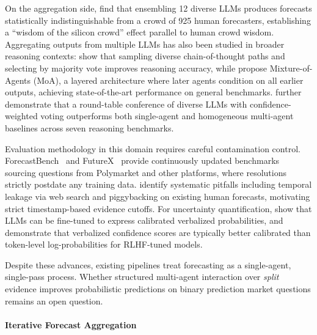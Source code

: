 \documentclass[11pt]{article}
\theoremstyle{definition}          %
\begin{document}
On the aggregation side, \citet{schoenegger2024wisdom} find that ensembling 12 diverse LLMs produces forecasts statistically indistinguishable from a crowd of 925 human forecasters, establishing a ``wisdom of the silicon crowd'' effect parallel to human crowd wisdom.
Aggregating outputs from multiple LLMs has also been studied in broader reasoning contexts: \citet{wangself} show that sampling diverse chain-of-thought paths and selecting by majority vote improves reasoning accuracy, while \citet{wangmixture} propose Mixture-of-Agents (MoA), a layered architecture where later agents condition on all earlier outputs, achieving state-of-the-art performance on general benchmarks.
\citet{chen2024reconcile} further demonstrate that a round-table conference of diverse LLMs with confidence-weighted voting outperforms both single-agent and homogeneous multi-agent baselines across seven reasoning benchmarks.

Evaluation methodology in this domain requires careful contamination control.
ForecastBench~\citep{karger2024forecastbench} and FutureX~\citep{zeng2025futurex} provide continuously updated benchmarks sourcing questions from Polymarket and other platforms, where resolutions strictly postdate any training data.
\citet{paleka2025pitfalls} identify systematic pitfalls including temporal leakage via web search and piggybacking on existing human forecasts, motivating strict timestamp-based evidence cutoffs.
For uncertainty quantification, \citet{lin2022teaching} show that LLMs can be fine-tuned to express calibrated verbalized probabilities, and \citet{tian2023just} demonstrate that verbalized confidence scores are typically better calibrated than token-level log-probabilities for RLHF-tuned models.

Despite these advances, existing pipelines treat forecasting as a single-agent, single-pass process. Whether structured multi-agent interaction over \emph{split} evidence improves probabilistic predictions on binary prediction market questions remains an open question.

\paragraph{Iterative Forecast Aggregation}
\end{document}
